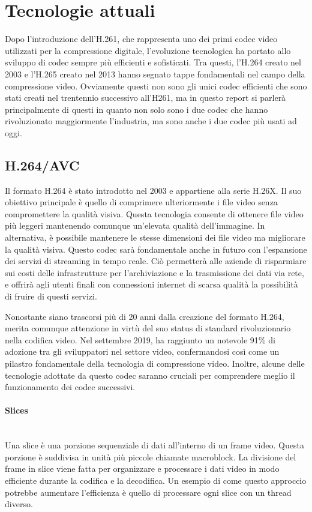 \documentclass[a4paper,12pt, oneside]{article}
\begin{document}
\section{Tecnologie attuali}
Dopo l'introduzione dell'H.261, che rappresenta uno dei primi codec video utilizzati per la compressione
digitale, l'evoluzione tecnologica ha portato allo sviluppo di codec sempre più efficienti e sofisticati.
Tra questi, l'H.264 creato nel 2003 e l'H.265 creato nel 2013 hanno segnato tappe fondamentali nel campo
della compressione video. Ovviamente questi non sono gli unici codec efficienti che sono stati creati nel
trentennio successivo all'H261, ma in questo report si parlerà principalmente di questi in quanto non
solo sono i due codec che hanno rivoluzionato maggiormente l'industria, ma sono anche i due codec più
usati ad oggi.

\subsection{H.264/AVC}
Il formato H.264 è stato introdotto nel 2003 e appartiene alla serie H.26X. Il suo obiettivo principale
è quello di comprimere ulteriormente i file video senza compromettere la qualità visiva. Questa
tecnologia consente di ottenere file video più leggeri mantenendo comunque un'elevata qualità
dell'immagine. In alternativa, è possibile mantenere le stesse dimensioni dei file video ma migliorare
la qualità visiva. Questo codec sarà fondamentale anche in futuro con l'espansione dei servizi di
streaming in tempo reale. Ciò permetterà alle aziende di risparmiare sui costi delle infrastrutture
per l'archiviazione e la trasmissione dei dati via rete, e offrirà agli utenti finali con connessioni
internet di scarsa qualità la possibilità di fruire di questi servizi.

Nonostante siano trascorsi più di 20 anni dalla creazione del formato H.264, merita comunque attenzione
in virtù del suo status di standard rivoluzionario nella codifica video. Nel settembre 2019, ha
raggiunto un notevole 91\% di adozione tra gli sviluppatori nel settore video, confermandosi così come
un pilastro fondamentale della tecnologia di compressione video. Inoltre, alcune delle tecnologie
adottate da questo codec saranno cruciali per comprendere meglio il funzionamento dei codec successivi.

\paragraph{Slices}\hphantom{A}\\
Una slice è una porzione sequenziale di dati all'interno di un frame video. Questa porzione è suddivisa
in unità più piccole chiamate macroblock. La divisione del frame in slice viene fatta per organizzare e
processare i dati video in modo efficiente durante la codifica e la decodifica. Un esempio di come
questo approccio potrebbe aumentare l'efficienza è quello di processare ogni slice con un thread diverso.
\end{document}
